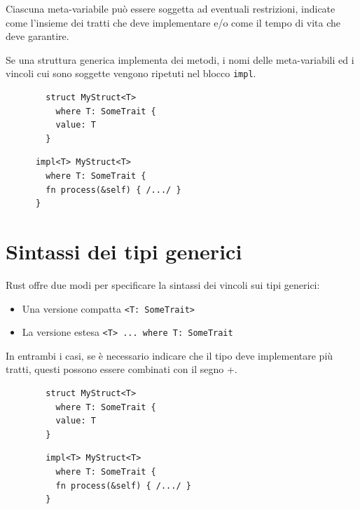 Ciascuna meta-variabile può essere soggetta ad eventuali restrizioni, indicate
come l'insieme dei tratti che deve implementare e/o come il tempo di vita che
deve garantire.


Se una struttura generica implementa dei metodi, i nomi delle meta-variabili ed
i vincoli cui sono soggette vengono ripetuti nel blocco \texttt{impl}.



\begin{center}
  \begin{minipage}{0.47\linewidth}
    \begin{verbatim}    
        struct MyStruct<T>
          where T: SomeTrait {
          value: T
        }
    \end{verbatim}

  \end{minipage}
  \hfill
  \begin{minipage}{0.47\linewidth}
    \begin{verbatim}
      impl<T> MyStruct<T>
        where T: SomeTrait {
        fn process(&self) { /.../ }
      }
    \end{verbatim}

  \end{minipage}
\end{center}


\section{Sintassi dei tipi generici}

Rust offre due modi per specificare la sintassi dei vincoli sui tipi generici:

\begin{itemize}
  \item Una versione compatta \verb|<T: SomeTrait>|
  \item La versione estesa \verb|<T> ... where T: SomeTrait|
\end{itemize}

In entrambi i casi, se è necessario indicare che il tipo deve implementare più tratti,
questi possono essere combinati con il segno +.


\begin{center}
  \begin{minipage}{0.47\linewidth}
    \begin{verbatim}    
        struct MyStruct<T>
          where T: SomeTrait {
          value: T
        }
    \end{verbatim}

  \end{minipage}
  \hfill
  \begin{minipage}{0.47\linewidth}
    \begin{verbatim}
        impl<T> MyStruct<T>
          where T: SomeTrait {
          fn process(&self) { /.../ }
        }
    \end{verbatim}

  \end{minipage}
\end{center}

